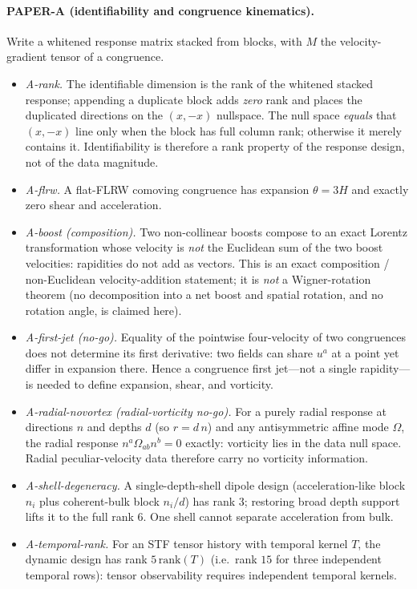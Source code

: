 \documentclass[11pt,a4paper]{article}
\theoremstyle{plain}
\theoremstyle{definition}
\begin{document}
\paragraph{PAPER-A (identifiability and congruence kinematics).}
Write a whitened response matrix stacked from blocks, with $M$ the
velocity-gradient tensor of a congruence.
\begin{itemize}[leftmargin=1.4em,itemsep=2pt]
  \item \emph{A-rank.} The identifiable dimension is the rank of the
        whitened stacked response; appending a duplicate block adds
        \emph{zero} rank and places the duplicated directions on the
        $(x,-x)$ nullspace. The null space \emph{equals} that
        $(x,-x)$ line only when the block has full column rank;
        otherwise it merely contains it. Identifiability is therefore a
        rank property of the response design, not of the data magnitude.
  \item \emph{A-flrw.} A flat-FLRW comoving congruence has expansion
        $\theta=3H$ and exactly zero shear and acceleration.
  \item \emph{A-boost (composition).} Two non-collinear boosts compose
        to an exact Lorentz transformation whose velocity is \emph{not}
        the Euclidean sum of the two boost velocities: rapidities do not
        add as vectors. This is an exact composition / non-Euclidean
        velocity-addition statement; it is \emph{not} a Wigner-rotation
        theorem (no decomposition into a net boost and spatial rotation,
        and no rotation angle, is claimed here).
  \item \emph{A-first-jet (no-go).} Equality of the pointwise
        four-velocity of two congruences does not determine its first
        derivative: two fields can share $u^a$ at a point yet differ in
        expansion there. Hence a congruence first jet---not a single
        rapidity---is needed to define expansion, shear, and vorticity.
  \item \emph{A-radial-novortex (radial-vorticity no-go).} For a purely
        radial response at directions $n$ and depths $d$ (so $r=d\,n$)
        and any antisymmetric affine mode $\Omega$, the radial response
        $n^a\Omega_{ab}n^b=0$ exactly: vorticity lies in the data null
        space. Radial peculiar-velocity data therefore carry no vorticity
        information.
  \item \emph{A-shell-degeneracy.} A single-depth-shell dipole design
        (acceleration-like block $n_i$ plus coherent-bulk block $n_i/d$)
        has rank $3$; restoring broad depth support lifts it to the full
        rank $6$. One shell cannot separate acceleration from bulk.
  \item \emph{A-temporal-rank.} For an STF tensor history with temporal
        kernel $T$, the dynamic design has rank $5\,\mathrm{rank}(T)$
        (i.e.\ rank $15$ for three independent temporal rows): tensor
        observability requires independent temporal kernels.
\end{itemize}
\end{document}
